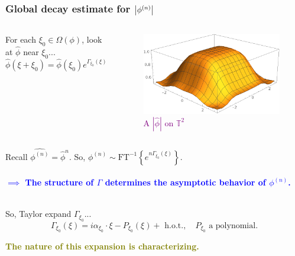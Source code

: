 \documentclass{beamer}
\theoremstyle{definition}
\begin{document}
\begin{frame}
\frametitle{Global decay estimate for $\abs{\phi^{(n)}}$}


\begin{columns}
	\centering
	For each $\xi_0\in \Omega(\phi)$, look at $\widehat{\phi}$ near $\xi_0$...
	\begin{equation*}
	\widehat{\phi}(\xi+\xi_0) = \widehat{\phi}(\xi_0) e^{\Gamma_{\xi_0}(\xi)}
	\end{equation*}
	\begin{figure}
		\includegraphics[scale=0.30]{d_dim_ex_1}
		\caption{\textcolor{purple}{A $|\widehat{\phi}|$ on $\mathbb{T}^2$}}
	\end{figure}
\end{columns} 
\vspace{-15pt}








%


\pause

Recall $\widehat{\phi^{(n)}} = \widehat{\phi}^{n}$. So, $\phi^{(n)}  \sim \text{FT}^{-1}\left\{ e^{n\Gamma_{\xi_0}(\xi)} \right\}$.\\
$\,$\\



\textcolor{blue}{\textbf{$\implies$ The structure of $\Gamma$ determines the asymptotic behavior of ${\phi}^{(n)}$.}} \\
$\,$\\



\pause


So, Taylor expand $\Gamma_{\xi_0}$...
\begin{equation*}
\Gamma_{\xi_0}(\xi)=i\alpha_{\xi_0}\cdot\xi -P_{\xi_0}(\xi) + \text{ h.o.t.}, \quad P_{\xi_0} \text{ a polynomial.}
\end{equation*}

\textcolor{olive}{\textbf{The nature of this expansion is characterizing.}}


\end{frame}
\end{document}
